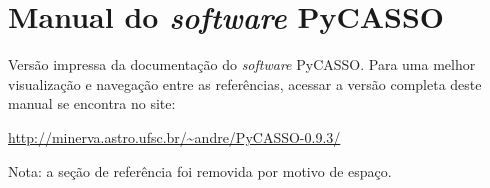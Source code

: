 


\chapter{Manual do {\em software} PyCASSO}
\label{apendice:manual}

Versão impressa da documentação do {\em software} PyCASSO. Para uma melhor
visualização e navegação entre as referências, acessar a versão completa deste
manual se encontra no site:

\url{http://minerva.astro.ufsc.br/~andre/PyCASSO-0.9.3/}

Nota: a seção de referência foi removida por motivo de espaço.

\cleardoublepage




